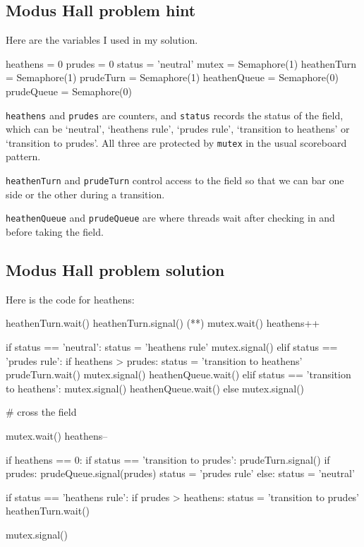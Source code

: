 \documentclass{book}
\begin{document}
\subsection {Modus Hall problem hint}

Here are the variables I used in my solution.

\begin{unbreakable}[title={Modus problem hint}]{}
heathens = 0
prudes = 0
status = 'neutral'
mutex = Semaphore(1)
heathenTurn = Semaphore(1)
prudeTurn = Semaphore(1)
heathenQueue = Semaphore(0)
prudeQueue = Semaphore(0)
\end{unbreakable}

{\tt heathens} and {\tt prudes} are counters, and {\tt status} records
the status of the field, which can be `neutral', `heathens rule',
`prudes rule', `transition to heathens' or `transition to prudes'.
All three are protected by {\tt mutex} in the usual scoreboard
pattern.

    {\tt heathenTurn} and {\tt prudeTurn} control access to the field
so that we can bar one side or the other during a transition.

    {\tt heathenQueue} and {\tt prudeQueue} are where threads wait after
checking in and before taking the field.



\subsection {Modus Hall problem solution}

Here is the code for heathens:

\begin{unbreakable}[title={Modus problem solution}]{}
heathenTurn.wait()
heathenTurn.signal()
(*\label{silentmajority}*)
mutex.wait()
heathens++

if status == 'neutral':
    status = 'heathens rule'
    mutex.signal()
elif status == 'prudes rule':
    if heathens > prudes:
        status = 'transition to heathens'
        prudeTurn.wait()
    mutex.signal()
    heathenQueue.wait()
elif status == 'transition to heathens':
    mutex.signal()
    heathenQueue.wait()
else
    mutex.signal()

# cross the field

mutex.wait()
heathens--

if heathens == 0:
    if status == 'transition to prudes':
        prudeTurn.signal()
    if prudes:
        prudeQueue.signal(prudes)
        status = 'prudes rule'
    else:
        status = 'neutral'
        
if status == 'heathens rule':
    if prudes > heathens:
        status = 'transition to prudes'
        heathenTurn.wait()

mutex.signal()
\end{unbreakable}
\end{document}
